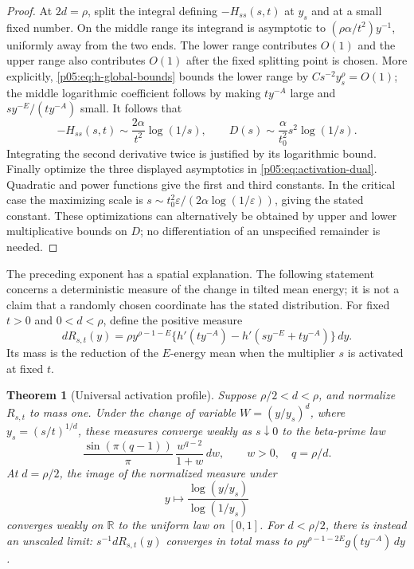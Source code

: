 \documentclass[11pt,letterpaper]{article}
\newtheorem{theorem}{Theorem}[section]
\theoremstyle{definition}
\theoremstyle{remark}
\newcommand{\1}{\mathbf 1}
\begin{document}
\begin{proof}
At $2d=\rho$, split the integral defining $-H_{ss}(s,t)$ at
$y_s$ and at a small fixed number. On the middle range its integrand
is asymptotic to $(\rho\alpha/t^2)y^{-1}$, uniformly away from
the two ends. The lower range contributes $O(1)$ and the upper range
also contributes $O(1)$ after the fixed splitting point is chosen.
More explicitly, \eqref{p05:eq:h-global-bounds} bounds the lower range
by $Cs^{-2}y_s^\rho=O(1)$; the middle logarithmic coefficient follows
by making $ty^{-A}$ large and $s y^{-E}/(ty^{-A})$ small.
It follows that
\[
 -H_{ss}(s,t)\sim\frac{2\alpha}{t^2}\log(1/s),\qquad
 D(s)\sim\frac{\alpha}{t_0^2}s^2\log(1/s).
\]
Integrating the second derivative twice is justified by its
logarithmic bound. Finally optimize the three displayed asymptotics
in \eqref{p05:eq:activation-dual}. Quadratic and power functions give
the first and third constants. In the critical case the maximizing
scale is
$s\sim t_0^2\varepsilon/(2\alpha\log(1/\varepsilon))$,
giving the stated constant. These optimizations can alternatively
be obtained by upper and lower multiplicative bounds on $D$;
no differentiation of an unspecified remainder is needed.
\end{proof}

The preceding exponent has a spatial explanation. The following
statement concerns a deterministic measure of the change in tilted
mean energy; it is not a claim that a randomly chosen coordinate
has the stated distribution.
For fixed $t>0$ and $0<d<\rho$, define the positive measure
\[
 dR_{s,t}(y)=\rho y^{\rho-1-E}
 \{h'(ty^{-A})-h'(sy^{-E}+ty^{-A})\}\,dy.
\]
Its mass is the reduction of the $E$-energy mean when the multiplier
$s$ is activated at fixed $t$.

\begin{theorem}[Universal activation profile]\label{p05:thm:activation-profile}
Suppose $\rho/2<d<\rho$, and normalize $R_{s,t}$ to mass one.
Under the change of variable $W=(y/y_s)^d$, where
$y_s=(s/t)^{1/d}$, these measures converge weakly as $s\downarrow0$
to the beta-prime law
\begin{equation}\label{p05:eq:beta-front}
 \frac{\sin(\pi(q-1))}{\pi}\,
 \frac{w^{q-2}}{1+w}\,dw,\qquad w>0,
 \quad q=\rho/d.
\end{equation}
At $d=\rho/2$, the image of the normalized measure under
\[
 y\longmapsto\frac{\log(y/y_s)}{\log(1/y_s)}
\]
converges weakly on $\mathbb R$ to the uniform law on $[0,1]$.
For $d<\rho/2$, there is instead an unscaled limit:
$s^{-1}dR_{s,t}(y)$ converges in total mass to
$\rho y^{\rho-1-2E}g(ty^{-A})\,dy$.
\end{theorem}
\end{document}
